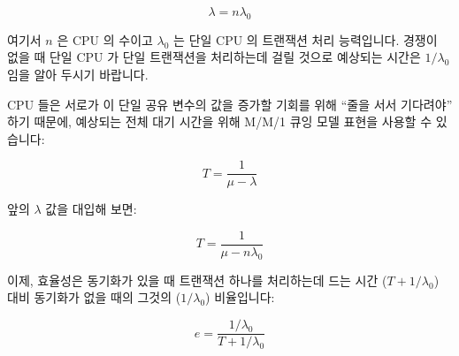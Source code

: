 \fi

\begin{equation}
	\lambda = n \lambda_0
\end{equation}

여기서 $n$ 은 CPU 의 수이고 $\lambda_0$ 는 단일 CPU 의 트랜잭션 처리
능력입니다.
경쟁이 없을 때 단일 CPU 가 단일 트랜잭션을 처리하는데 걸릴 것으로 예상되는
시간은 $1 / \lambda_0$ 임을 알아 두시기 바랍니다.

CPU 들은 서로가 이 단일 공유 변수의 값을 증가할 기회를 위해 ``줄을 서서
기다려야'' 하기 때문에, 예상되는 전체 대기 시간을 위해 M/M/1 큐잉 모델 표현을
사용할 수 있습니다:

\begin{equation}
	T = \frac{1}{\mu - \lambda}
\end{equation}

앞의 $\lambda$ 값을 대입해 보면:

\begin{equation}
	T = \frac{1}{\mu - n \lambda_0}
\end{equation}

이제, 효율성은 동기화가 있을 때 트랜잭션 하나를 처리하는데 드는 시간 ($T + 1 /
\lambda_0$) 대비 동기화가 없을 때의 그것의 ($1 / \lambda_0$) 비율입니다:

\begin{equation}
	e = \frac{1 / \lambda_0}{T + 1 / \lambda_0}
\end{equation}


